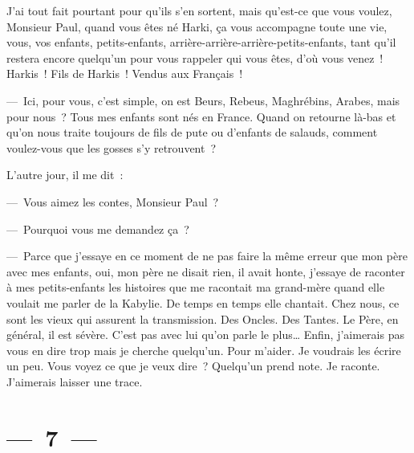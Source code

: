\documentclass[french,twoside]{book} %
\begin{document}
\noindent J’ai tout fait pourtant pour qu’ils s’en sortent, mais qu’est-ce que vous voulez, Monsieur Paul, quand vous êtes né Harki, ça vous accompagne toute une vie, vous, vos enfants, petits-enfants, arrière-arrière-arrière-petits-enfants, tant qu’il restera encore quelqu’un pour vous rappeler qui vous êtes, d’où vous venez ! Harkis ! Fils de Harkis ! Vendus aux Français !\par
— Ici, pour vous, c’est simple, on est Beurs, Rebeus, Maghrébins, Arabes, mais pour nous ? Tous mes enfants sont nés en France. Quand on retourne là-bas et qu’on nous traite toujours de fils de pute ou d’enfants de salauds, comment voulez-vous que les gosses s’y retrouvent ?\par
L’autre jour, il me dit :\par
— Vous aimez les contes, Monsieur Paul ?\par
— Pourquoi vous me demandez ça ?\par
— Parce que j’essaye en ce moment de ne pas faire la même erreur que mon père avec mes enfants, oui, mon père ne disait rien, il avait honte, j’essaye de raconter à mes petits-enfants les histoires que me racontait ma grand-mère quand elle voulait me parler de la Kabylie. De temps en temps elle chantait. Chez nous, ce sont les vieux qui assurent la transmission. Des Oncles. Des Tantes. Le Père, en général, il est sévère. C’est pas avec lui qu’on parle le plus… Enfin, j’aimerais pas vous en dire trop mais je cherche quelqu’un. Pour m’aider. Je voudrais les écrire un peu. Vous voyez ce que je veux dire ? Quelqu’un prend note. Je raconte. J’aimerais laisser une trace.

\section[{— 7 —}]{— 7 —}
\renewcommand{\leftmark}{— 7 —}
\end{document}
